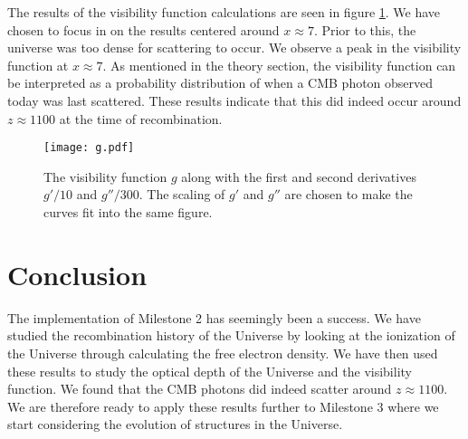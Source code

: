 \documentclass[a4paper, 10pt, reqno]{amsart}
\begin{document}
The results of the visibility function calculations are seen in figure
\ref{fig: g}. We have chosen to focus in on the results centered around $x
\approx 7$. Prior to this, the universe was too dense for scattering to occur.
We observe a peak in the visibility function at $x \approx 7$. As mentioned in
the theory section, the visibility function can be interpreted as a
probability distribution of when a CMB photon observed today was last
scattered. These results indicate that this did indeed occur around $ z
\approx 1100$ at the time of recombination.
\begin{figure}
    \centering
    \texttt{[image: g.pdf]}
    \caption{The visibility function $g$ along with the first and second
    derivatives $g'/10$ and $g''/300$. The scaling of $g'$ and $g''$ are
    chosen to make the curves fit into the same figure.}
    \label{fig: g}
\end{figure}

\section{Conclusion}
The implementation of Milestone 2 has seemingly been a success. We have
studied the recombination history of the Universe by looking at the ionization
of the Universe through calculating the free electron density. We have then
used these results to study the optical depth of the Universe and the
visibility function. We found that the CMB photons did indeed scatter around
$z \approx 1100$. We are therefore ready to apply these results further to
Milestone 3 where we start considering the evolution of structures in the
Universe.

\nocite{*}
{}

\end{document}

